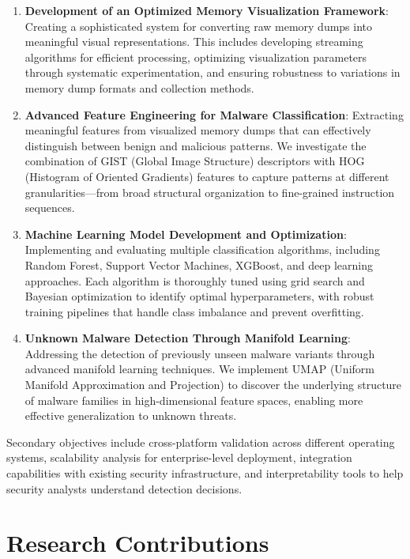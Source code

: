 \begin{enumerate}
    \item \textbf{Development of an Optimized Memory Visualization Framework}: Creating a sophisticated system for converting raw memory dumps into meaningful visual representations. This includes developing streaming algorithms for efficient processing, optimizing visualization parameters through systematic experimentation, and ensuring robustness to variations in memory dump formats and collection methods.
    
    \item \textbf{Advanced Feature Engineering for Malware Classification}: Extracting meaningful features from visualized memory dumps that can effectively distinguish between benign and malicious patterns. We investigate the combination of GIST (Global Image Structure) descriptors with HOG (Histogram of Oriented Gradients) features to capture patterns at different granularities—from broad structural organization to fine-grained instruction sequences.
    
    \item \textbf{Machine Learning Model Development and Optimization}: Implementing and evaluating multiple classification algorithms, including Random Forest, Support Vector Machines, XGBoost, and deep learning approaches. Each algorithm is thoroughly tuned using grid search and Bayesian optimization to identify optimal hyperparameters, with robust training pipelines that handle class imbalance and prevent overfitting.
    
    \item \textbf{Unknown Malware Detection Through Manifold Learning}: Addressing the detection of previously unseen malware variants through advanced manifold learning techniques. We implement UMAP (Uniform Manifold Approximation and Projection) to discover the underlying structure of malware families in high-dimensional feature spaces, enabling more effective generalization to unknown threats.
\end{enumerate}

Secondary objectives include cross-platform validation across different operating systems, scalability analysis for enterprise-level deployment, integration capabilities with existing security infrastructure, and interpretability tools to help security analysts understand detection decisions.

\section{Research Contributions}
\label{sec:contributions}

